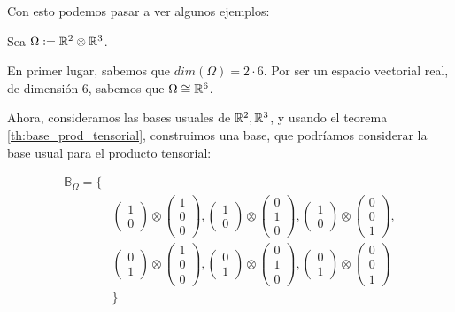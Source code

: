Con esto podemos pasar a ver algunos ejemplos:

\begin{ejemplo}
    Sea $\Omega := \mathbb{R}^2 \otimes \mathbb{R}^3$.

    En primer lugar, sabemos que $dim(\Omega) = 2 \cdot 6$. Por ser un espacio vectorial real, de dimensión $6$, sabemos que $\Omega \cong \mathbb{R}^6$.

    Ahora, consideramos las bases usuales de $\mathbb{R}^2, \mathbb{R}^3$, y usando el teorema \ref{th:base_prod_tensorial}, construimos una base, que podríamos considerar la base usual para el producto tensorial:

    \begin{equation}
    \begin{split}
    \mathbb{B}_{\Omega} = \{& \\
        & \begin{pmatrix}1 \\ 0 \end{pmatrix} \otimes \begin{pmatrix} 1 \\ 0 \\ 0 \end{pmatrix},
        \begin{pmatrix}1 \\ 0 \end{pmatrix} \otimes \begin{pmatrix} 0 \\ 1 \\ 0 \end{pmatrix},
        \begin{pmatrix}1 \\ 0 \end{pmatrix} \otimes \begin{pmatrix} 0 \\ 0 \\ 1 \end{pmatrix}, \\
        & \begin{pmatrix}0 \\ 1 \end{pmatrix} \otimes \begin{pmatrix} 1 \\ 0 \\ 0 \end{pmatrix},
        \begin{pmatrix}0 \\ 1 \end{pmatrix} \otimes \begin{pmatrix} 0 \\ 1 \\ 0 \end{pmatrix},
        \begin{pmatrix}0 \\ 1 \end{pmatrix} \otimes \begin{pmatrix} 0 \\ 0 \\ 1 \end{pmatrix} \\
    & \}
    \end{split}
    \end{equation}


\end{ejemplo}
